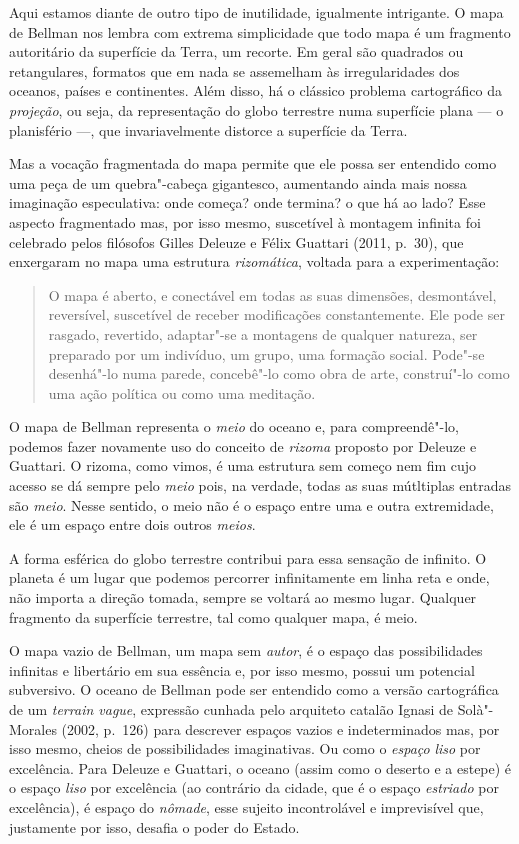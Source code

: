 Aqui estamos diante de outro tipo de inutilidade, igualmente intrigante.
O mapa de Bellman nos lembra com extrema simplicidade que todo mapa é um
fragmento autoritário da superfície da Terra, um recorte. Em geral são
quadrados ou retangulares, formatos que em nada se assemelham às
irregularidades dos oceanos, países e continentes. Além disso, há o
clássico problema cartográfico da \emph{projeção}, ou seja, da
representação do globo terrestre numa superfície plana --- o planisfério
---, que invariavelmente distorce a superfície da Terra.

Mas a vocação fragmentada do mapa permite que ele possa ser entendido
como uma peça de um quebra"-cabeça gigantesco, aumentando ainda mais
nossa imaginação especulativa: onde começa? onde termina? o que há ao
lado? Esse aspecto fragmentado mas, por isso mesmo, suscetível à
montagem infinita foi celebrado pelos filósofos Gilles Deleuze e Félix
Guattari (2011, p.~30), que enxergaram no mapa uma estrutura
\emph{rizomática}, voltada para a experimentação:

\begin{quote}
O mapa é aberto, e conectável em todas as suas dimensões, desmontável,
reversível, suscetível de receber modificações constantemente. Ele pode
ser rasgado, revertido, adaptar"-se a montagens de qualquer natureza, ser
preparado por um indivíduo, um grupo, uma formação social. Pode"-se
desenhá"-lo numa parede, concebê"-lo como obra de arte, construí"-lo como
uma ação política ou como uma meditação.
\end{quote}

O mapa de Bellman representa o \emph{meio} do oceano e, para
compreendê"-lo, podemos fazer novamente uso do conceito de \emph{rizoma}
proposto por Deleuze e Guattari. O rizoma, como vimos, é uma estrutura
sem começo nem fim cujo acesso se dá sempre pelo \emph{meio} pois, na
verdade, todas as suas mútltiplas entradas são \emph{meio}. Nesse
sentido, o meio não é o espaço entre uma e outra extremidade, ele é um
espaço entre dois outros \emph{meios}.

A forma esférica do globo terrestre contribui para essa sensação de
infinito. O planeta é um lugar que podemos percorrer infinitamente em
linha reta e onde, não importa a direção tomada, sempre se voltará ao
mesmo lugar. Qualquer fragmento da superfície terrestre, tal como
qualquer mapa, é meio.

O mapa vazio de Bellman, um mapa sem \emph{autor}, é o espaço das
possibilidades infinitas e libertário em sua essência e, por isso mesmo,
possui um potencial subversivo. O oceano de Bellman pode ser entendido
como a versão cartográfica de um \emph{terrain vague}, expressão cunhada
pelo arquiteto catalão Ignasi de Solà"-Morales (2002, p.~126) para descrever espaços vazios e indeterminados mas, por isso
mesmo, cheios de possibilidades imaginativas. Ou como o \emph{espaço}
\emph{liso} por excelência. Para Deleuze e Guattari, o oceano (assim
como o deserto e a estepe) é o espaço \emph{liso} por excelência (ao
contrário da cidade, que é o espaço \emph{estriado} por excelência), é
espaço do \emph{nômade}, esse sujeito incontrolável e imprevisível que,
justamente por isso, desafia o poder do Estado.

